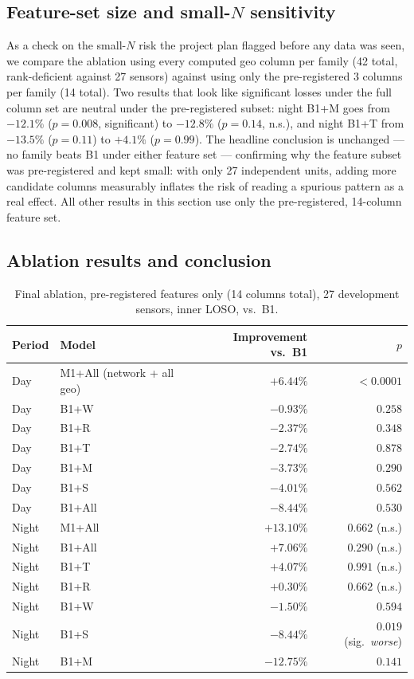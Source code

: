 \documentclass[11pt]{article}
\begin{document}
\subsection*{Feature-set size and small-$N$ sensitivity}

As a check on the small-$N$ risk the project plan flagged before any data
was seen, we compare the ablation using every computed geo column per
family (42 total, rank-deficient against 27 sensors) against using only
the pre-registered 3 columns per family (14 total). Two results that look
like significant losses under the full column set are neutral under the
pre-registered subset: night B1+M goes from $-12.1\%$ ($p=0.008$,
significant) to $-12.8\%$ ($p=0.14$, n.s.), and night B1+T from $-13.5\%$
($p=0.11$) to $+4.1\%$ ($p=0.99$). The headline conclusion is unchanged ---
no family beats B1 under either feature set --- confirming why the feature
subset was pre-registered and kept small: with only 27 independent units,
adding more candidate columns measurably inflates the risk of reading a
spurious pattern as a real effect. All other results in this section use
only the pre-registered, 14-column feature set.

\subsection*{Ablation results and conclusion}

\begin{table}[H]
  \centering
  \caption{Final ablation, pre-registered features only (14 columns total),
  27 development sensors, inner LOSO, vs.\ B1.}
  \label{tab:geo-final}
  \begin{tabular}{llrr}
    \toprule
    Period & Model & Improvement vs.\ B1 & $p$ \\
    \midrule
    Day & M1+All (network + all geo) & $+6.44\%$ & $<0.0001$ \\
    Day & B1+W & $-0.93\%$ & $0.258$ \\
    Day & B1+R & $-2.37\%$ & $0.348$ \\
    Day & B1+T & $-2.74\%$ & $0.878$ \\
    Day & B1+M & $-3.73\%$ & $0.290$ \\
    Day & B1+S & $-4.01\%$ & $0.562$ \\
    Day & B1+All & $-8.44\%$ & $0.530$ \\
    \midrule
    Night & M1+All & $+13.10\%$ & $0.662$ (n.s.) \\
    Night & B1+All & $+7.06\%$ & $0.290$ (n.s.) \\
    Night & B1+T & $+4.07\%$ & $0.991$ (n.s.) \\
    Night & B1+R & $+0.30\%$ & $0.662$ (n.s.) \\
    Night & B1+W & $-1.50\%$ & $0.594$ \\
    Night & B1+S & $-8.44\%$ & $\mathbf{0.019}$ (sig.\ \emph{worse}) \\
    Night & B1+M & $-12.75\%$ & $0.141$ \\
    \bottomrule
  \end{tabular}
\end{table}
\end{document}

